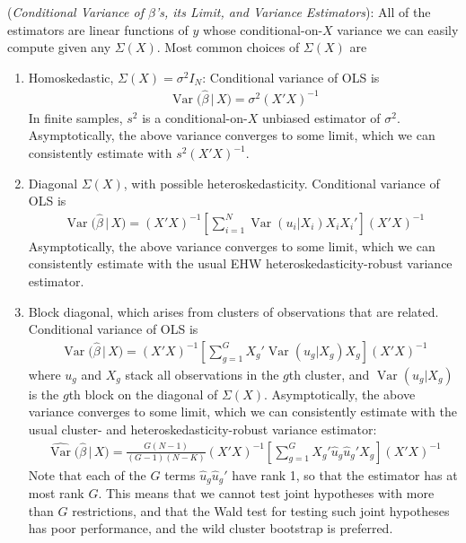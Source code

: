 \documentclass[12pt]{article}
\theoremstyle{plain}
\theoremstyle{definition}
\theoremstyle{remark}
\newcommand{\Var}{\operatorname{Var}}
\begin{document}
(\emph{Conditional Variance of $\hat{\beta}$'s, its Limit, and Variance Estimators}):
All of the estimators are linear functions of $y$ whose
conditional-on-$X$ variance we can easily compute given
any $\Sigma(X)$.
Most common choices of $\Sigma(X)$ are
\begin{enumerate}
  \item Homoskedastic, $\Sigma(X)=\sigma^2 I_N$:
    Conditional variance of OLS is
    \begin{align*}
      \Var\big(\hat{\beta}\,\big|\,X\big)
      = \sigma^2(X'X)^{-1}
    \end{align*}
    In finite samples, $s^2$ is a conditional-on-$X$ unbiased
    estimator of $\sigma^2$.
    Asymptotically, the above variance converges to some limit,
    which we can consistently estimate with $s^2(X'X)^{-1}$.


  \item Diagonal $\Sigma(X)$, with possible heteroskedasticity.
    Conditional variance of OLS is
    \begin{align*}
      \Var\big(\hat{\beta}\,\big|\,X\big)
      = (X'X)^{-1}
        \left[
          \sum_{i=1}^N
          \Var(u_i|X_i)
          X_iX_i'
        \right]
        (X'X)^{-1}
    \end{align*}
    Asymptotically, the above variance converges to some limit,
    which we can consistently estimate with the usual EHW
    heteroskedasticity-robust variance estimator.

  \item Block diagonal, which arises from clusters of
    observations that are related.
    Conditional variance of OLS is
    \begin{align*}
      \Var\big(\hat{\beta}\,\big|\,X\big)
      = (X'X)^{-1}
        \left[
          \sum_{g=1}^G
          X_g'
          \Var(u_g|X_g)
          X_g
        \right]
        (X'X)^{-1}
    \end{align*}
    where $u_g$ and $X_g$ stack all observations in the $g$th
    cluster, and $\Var(u_g|X_g)$ is the $g$th block on the
    diagonal of $\Sigma(X)$.
    Asymptotically, the above variance converges to some limit,
    which we can consistently estimate with the usual cluster-
    and heteroskedasticity-robust variance estimator:
    \begin{align*}
      \widehat{\Var}\big(\hat{\beta}\,\big|\,X\big)
      =
      \frac{G(N-1)}{(G-1)(N-K)}
        (X'X)^{-1}
        \left[
          \sum_{g=1}^G
          X_g'
          \widehat{u}_g
          \widehat{u}_g'
          X_g
        \right]
        (X'X)^{-1}
    \end{align*}
    Note that each of the $G$ terms $\widehat{u}_g \widehat{u}_g'$ have
    rank 1, so that the estimator has at most rank $G$.
    This means that we cannot test joint hypotheses with more than $G$
    restrictions, and that the Wald test for testing such joint
    hypotheses has poor performance, and the wild cluster bootstrap is
    preferred.


\end{enumerate}
\end{document}
